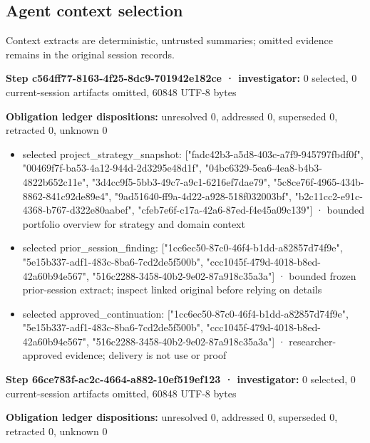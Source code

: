 \documentclass[11pt]{article}
\begin{document}
\subsection{Agent context selection}
Context extracts are deterministic, untrusted summaries; omitted evidence remains in the original session records.\par
\textbf{Step c564ff77-8163-4f25-8dc9-701942e182ce · investigator:} 0 selected, 0 current-session artifacts omitted, 60848 UTF-8 bytes\par
\textbf{Obligation ledger dispositions:} unresolved 0, addressed 0, superseded 0, retracted 0, unknown 0\par
\begin{itemize}
\item selected project\_strategy\_snapshot: ["fadc42b3-a5d8-403c-a7f9-945797fbdf0f", "00469f7f-ba53-4a12-944d-2d3295e48d1f", "04bc6329-5ea6-4ea8-b4b3-4822b652c11e", "3d4cc9f5-5bb3-49c7-a9c1-6216ef7dae79", "5c8ce76f-4965-434b-8862-841c92de89e4", "9ad51640-ff9a-4d22-a928-518f032003bf", "b2c11cc2-e91c-4368-b767-d322e80aabef", "cfeb7e6f-c17a-42a6-87ed-f4e45a09c139"] · bounded portfolio overview for strategy and domain context
\item selected prior\_session\_finding: ["1cc6ec50-87c0-46f4-b1dd-a82857d74f9e", "5e15b337-adf1-483c-8ba6-7cd2de5f500b", "ccc1045f-479d-4018-b8ed-42a60b94e567", "516c2288-3458-40b2-9e02-87a918c35a3a"] · bounded frozen prior-session extract; inspect linked original before relying on details
\item selected approved\_continuation: ["1cc6ec50-87c0-46f4-b1dd-a82857d74f9e", "5e15b337-adf1-483c-8ba6-7cd2de5f500b", "ccc1045f-479d-4018-b8ed-42a60b94e567", "516c2288-3458-40b2-9e02-87a918c35a3a"] · researcher-approved evidence; delivery is not use or proof
\end{itemize}
\textbf{Step 66ce783f-ac2c-4664-a882-10ef519ef123 · investigator:} 0 selected, 0 current-session artifacts omitted, 60848 UTF-8 bytes\par
\textbf{Obligation ledger dispositions:} unresolved 0, addressed 0, superseded 0, retracted 0, unknown 0\par
\end{document}
